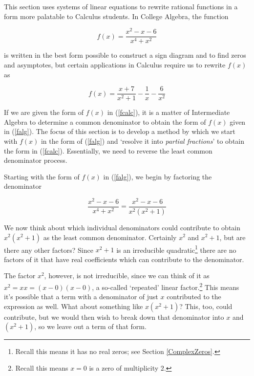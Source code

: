

\setcounter{footnote}{0}

\label{ParFrac}

\setlength{\extrarowheight}{0pt}

This section uses systems of linear equations to rewrite rational functions in a form more palatable to Calculus students. In College Algebra, the function 

\begin{equation} \label{falg} f(x) = \dfrac{x^2-x-6}{x^4+x^2} \tag{1} \end{equation}

is written in the best form possible to construct a sign diagram and to find zeros and asymptotes, but certain applications in Calculus require us to rewrite $f(x)$ as 

\begin{equation} \label{fcalc} f(x) = \dfrac{x+7}{x^2+1} - \dfrac{1}{x} - \dfrac{6}{x^2}  \tag{2} \end{equation}

If we are given the form of $f(x)$ in (\ref{fcalc}), it is a matter of Intermediate Algebra to determine a common denominator to obtain the form of $f(x)$ given in (\ref{falg}).  The focus of this section is to develop a method by which we start with $f(x)$ in the form of (\ref{falg}) and `resolve it into  \textit{partial fractions}' to obtain the form in (\ref{fcalc}).  Essentially, we need to reverse the least common denominator process.  

Starting with the form of $f(x)$ in (\ref{falg}), we begin by factoring the denominator

\[ \dfrac{x^2-x-6}{x^4+x^2} =  \dfrac{x^2-x-6}{x^2 \left(x^2+1\right)} \]

We now think about which individual denominators could contribute to obtain  $x^2 \left(x^2+1\right)$ as the least common denominator.  Certainly $x^2$ and $x^2+1$, but are there any other factors?  Since $x^2+1$ is an irreducible quadratic\footnote{Recall this means it has no real zeros;  see Section \ref{ComplexZeros}.} there are no factors of it that have real coefficients which can contribute to the denominator.  

The factor $x^2$, however, is not irreducible, since we can think of it as $x^2 = xx = (x-0)(x-0)$, a so-called `repeated' linear factor.\footnote{Recall this means $x=0$ is a zero of multiplicity $2$.}   This means it's possible that a term with a denominator of just $x$ contributed to the expression as well.  What about something like $x \left(x^2+1\right)$?  This, too, could contribute, but we would then wish to break down that denominator into $x$ and $\left(x^2+1\right)$, so we leave out a term of that form.  

